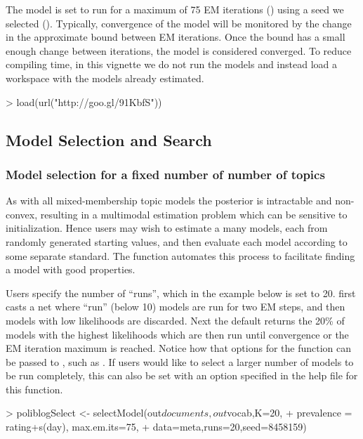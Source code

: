 \documentclass[nojss]{jss}
\begin{document}
The model is set to run for a maximum of 75 EM iterations () using a seed we selected ().  Typically, convergence of the model will be monitored by the change in the approximate bound between EM iterations.  Once the bound has a small enough change between iterations, the model is considered converged. To reduce compiling time, in this vignette we do not run the models and instead load a workspace with the models already estimated.

\begin{Schunk}
\begin{Sinput}
>  load(url("http://goo.gl/91KbfS"))
\end{Sinput}
\end{Schunk}

\subsection{Model Selection and Search}

\subsubsection{Model selection for a fixed number of number of topics}
As with all mixed-membership topic models the posterior is intractable and non-convex, resulting in a multimodal estimation problem which can be sensitive to initialization. Hence users may wish to estimate a many models, each from randomly generated starting values, and then evaluate each model according to some separate standard. The function  automates this process to facilitate finding a model with good properties.

Users specify the number of ``runs'', which in the example below is set to 20.  first casts a net where ``run'' (below 10) models are run for two EM steps, and then models with low likelihoods are discarded. Next the default returns the 20\% of models with the highest likelihoods which are then run until convergence or the EM iteration maximum is reached. Notice how that options for the  function can be passed to , such as . If users would like to select a larger number of models to be run completely, this can also be set with an option specified in the help file for this function.

\begin{Schunk}
\begin{Sinput}
> poliblogSelect <- selectModel(out$documents,out$vocab,K=20,
+         prevalence =~ rating+s(day), max.em.its=75,
+         data=meta,runs=20,seed=8458159)
\end{Sinput}
\end{Schunk}
\end{document}
